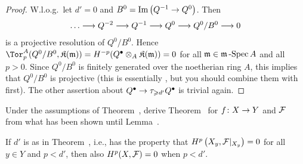 \documentclass[a4paper,parskip=half,numbers=enddot, DIV=12]{scrreprt}
\renewcommand{\geq}{\geqslant}
\begin{document}
\begin{proof}
	W.l.o.g.\ let $d'=0$ and $B^0=\Im\left(Q^{-1}\morphism Q^0\right)$. Then
	\begin{align*}
		\ldots \morphism Q^{-2}\morphism Q^{-1}\morphism Q^0\morphism Q^0/B^0\morphism 0
	\end{align*}
	is a projective resolution of $Q^0/B^0$. Hence $\Tor_p^A(Q^0/B^0,\KK(\mm))=H^{-p}(Q^\bullet\otimes_A\KK(\mm))=0$ for all $\mathfrak{m}\in\mathfrak{m}\operatorname{-Spec} A$ and all $p>0$. Since $Q^0/B^0$ is finitely generated over the noetherian ring $A$, this implies that $Q^0/B^0$ is projective (this is essentially \cite[Propositions~1.3.1 and~1.3.2]{homalg}, but you should combine them with \cite[Fact~1.2.4]{homalg} first). The other assertion about $Q^\bullet\morphism \tau_{\geq d'}Q^\bullet$ is trivial again.
\end{proof}
\begin{exc}
	Under the assumptions of Theorem~, derive Theorem~ for $f\colon X\morphism Y$ and $\mathcal{F}$ from what has been shown until Lemma~.
\end{exc}
\begin{lem}
	If $d'$ is as in Theorem~, i.e., has the property that $H^p\left(X_y,\mathcal{F}|_{X_y}\right)=0$ for all $y\in Y$ and $p<d'$, then also $H^p(X,\mathcal{F})=0$ when $p<d'$.
\end{lem}
\end{document}
